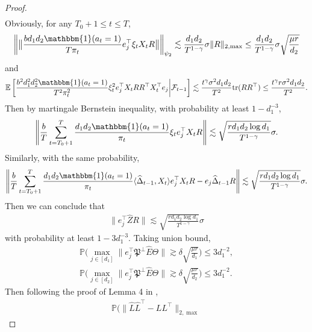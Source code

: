 \documentclass[12pt]{article}
\newcommand{\inp}[2]{\langle #1,#2\rangle}
\newcommand{\PP}{\mathbb{P}}
\def\EE{{\mathbb E}}
\def\PP{{\mathbb P}}
\theoremstyle{plain}
\begin{document}
\begin{proof}
\begin{align*}
    \end{align*} 
    Obviously, for any $T_0+1\leq t\leq T$,
    \begin{align*}
        \left\|\big\|\frac{bd_1d_2\mathbbm{1}(a_t=1)}{T\pi_t}e_j^{\top}\xi_tX_tR \big\|\right\|_{\psi_2}\lesssim \frac{d_1d_2}{T^{1-\gamma}}\sigma\|R\|_{2,\max}\leq \frac{d_1d_2}{T^{1-\gamma}}\sigma\sqrt{\frac{\mu r}{d_2}}
    \end{align*}
    and
    \begin{align*}
        \EE\left[\frac{b^2d_1^2d_2^2\mathbbm{1}(a_t=1)}{T^2\pi_t^2}\xi_t^2e_j^{\top}X_tRR^{\top}X_t^{\top}e_j \bigg|\mathcal{F}_{t-1}\right]\lesssim \frac{t^{\gamma}\sigma^2d_1d_2}{T^2}\text{tr}(RR^{\top})\leq \frac{t^{\gamma}r\sigma^2d_1d_2}{T^{2}}.
    \end{align*}
    Then by martingale Bernstein inequality, with probability at least $1-d_1^{-3}$,
    \begin{align*}
        \left\|\frac{b}{T}\sum_{t=T_0+1}^T \frac{d_1d_2\mathbbm{1}(a_t=1)}{\pi_t}\xi_te_j^{\top}X_tR \right\|\lesssim \sqrt{\frac{rd_1d_2\log d_1}{T^{1-\gamma}}}\sigma.
    \end{align*}
    Similarly, with the same probability,
    \begin{align*}
        \left\|\frac{b}{T}\sum_{t=T_0+1}^T \frac{d_1d_2\mathbbm{1}(a_t=1)}{\pi_t}\inp{\widehat{\Delta}_{t-1}}{X_t}e_j^{\top}X_tR - e_j\widehat{\Delta}_{t-1}R \right\|\lesssim \sqrt{\frac{rd_1d_2\log d_1}{T^{1-\gamma}}}\sigma.
    \end{align*}
    Then we can conclude that 
    \begin{align*}
        \|e_{j}^{\top}\widehat{Z}R\|\lesssim \sqrt{\frac{rd_1d_2\log d_1}{T^{1-\gamma}}}\sigma
    \end{align*}
    with probability at least $1-3d_1^{-3}$. Taking union bound, 
    \begin{align*}
        \PP\bigg(\max_{j\in [d_1]}\|e_j^{\top}\mathfrak{P}^{\perp}\widehat{E}\Theta\|\gtrsim \delta\sqrt{\frac{\mu r}{d_1}}\bigg)\leq 3d_1^{-2},\\
        \PP\bigg(\max_{j\in [d_2]}\|e_j^{\top}\mathfrak{P}^{\perp}\widehat{E}\Theta\|\gtrsim \delta\sqrt{\frac{\mu r}{d_2}}\bigg)\leq 3d_1^{-2}.
    \end{align*}
Then following the proof of Lemma 4 in \cite{xia2021statistical}, 
    \begin{align*}
        \PP\bigg(\|\widehat{L}\widehat{L}^{\top}-LL^{\top}\|_{2,\max}

\end{align*}
\end{proof}
\end{document}
